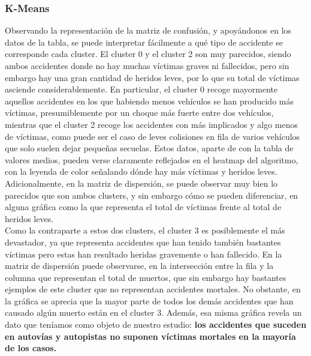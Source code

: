 	\subsubsection{K-Means}
	Observando la representación de la matriz de confusión, y apoyándonos en los datos de la tabla, se puede interpretar fácilmente a qué tipo de accidente se corresponde cada cluster. El cluster 0 y el cluster 2 son muy parecidos, siendo ambos accidentes donde no hay muchas víctimas graves ni fallecidos, pero sin embargo hay una gran cantidad de heridos leves, por lo que su total de víctimas asciende considerablemente. En particular, el cluster 0 recoge mayormente aquellos accidentes en los que habiendo menos vehículos se han producido más víctimas, presumiblemente por un choque más fuerte entre dos vehículos, mientras que el cluster 2 recoge los accidentes con más implicados y algo menos de víctimas, como puede ser el caso de leves colisiones en fila de varios vehículos que solo suelen dejar pequeñas secuelas. Estos datos, aparte de con la tabla de valores medios, pueden verse claramente reflejados en el heatmap del algoritmo, con la leyenda de color señalando dónde hay más víctimas y heridos leves. Adicionalmente, en la matriz de dispersión, se puede observar muy bien lo parecidos que son ambos clusters, y sin embargo cómo se pueden diferenciar, en alguna gráfica como la que representa el total de víctimas frente al total de heridos leves.\\
	
	Como la contraparte a estos dos clusters, el cluster 3 es posiblemente el más devastador, ya que representa accidentes que han tenido también bastantes víctimas pero estas han resultado heridas gravemente o han fallecido. En la matriz de dispersión puede observarse, en la intersección entre la fila y la columna que representan el total de muertos, que sin embargo hay bastantes ejemplos de este cluster que no representan accidentes mortales. No obstante, en la gráfica se aprecia que la mayor parte de todos los demás accidentes que han causado algún muerto están en el cluster 3. Además, esa misma gráfica revela un dato que teníamos como objeto de nuestro estudio: \textbf{los accidentes que suceden en autovías y autopistas no suponen víctimas mortales en la mayoría de los casos.} 
	
